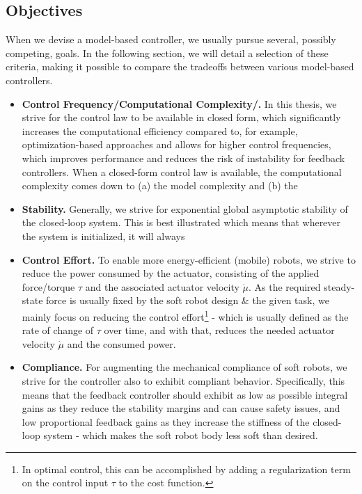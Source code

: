 \subsection{Objectives}
When we devise a model-based controller, we usually pursue several, possibly competing, goals. In the following section, we will detail a selection of these criteria, making it possible to compare the tradeoffs between various model-based controllers.
\begin{itemize}
    \item \textbf{Control Frequency/Computational Complexity/.} In this thesis, we strive for the control law to be available in closed form, which significantly increases the computational efficiency compared to, for example, optimization-based approaches and allows for higher control frequencies, which improves performance and reduces the risk of instability for feedback controllers. When a closed-form control law is available, the computational complexity comes down to (a) the model complexity and (b) the 
    \item \textbf{Stability.} Generally, we strive for exponential global asymptotic stability of the closed-loop system. This is best illustrated  which means that wherever the system is initialized, it will always  
    \item \textbf{Control Effort.} To enable more energy-efficient (mobile) robots, we strive to reduce the power consumed by the actuator, consisting of the applied force/torque $\tau$ and the associated actuator velocity $\dot{\mu}$. As the required steady-state force is usually fixed by the soft robot design \& the given task, we mainly focus on reducing the control effort\footnote{In optimal control, this can be accomplished by adding a regularization term on the control input $\tau$ to the cost function.} - which is usually defined as the rate of change of $\tau$ over time, and with that, reduces the needed actuator velocity $\dot{\mu}$ and the consumed power.
    \item \textbf{Compliance.} For augmenting the mechanical compliance of soft robots, we strive for the controller also to exhibit compliant behavior. Specifically, this means that the feedback controller should exhibit as low as possible integral gains as they reduce the stability margins and can cause safety issues, and low proportional feedback gains as they increase the stiffness of the closed-loop system - which makes the soft robot body less soft than desired.

\end{itemize}
